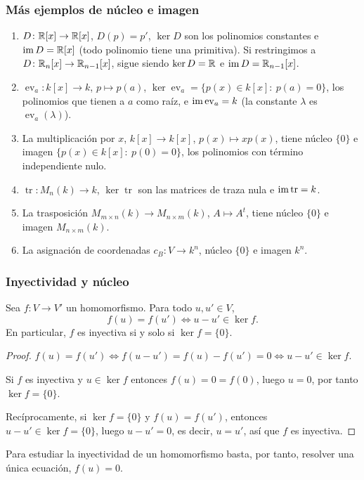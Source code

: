 \begin{frame}
    \frametitle{Más ejemplos de núcleo e imagen}

    \begin{example}
        \begin{enumerate}
            \item $D\colon\mathbb{R}[x]\to\mathbb{R}[x]$, $D(p)=p'$, $\ker D$ son los
            polinomios constantes e $\operatorname{im} D=\mathbb{R}[x]$ (todo polinomio tiene
            una primitiva). Si restringimos a $D\colon\mathbb{R}_n[x]\to\mathbb{R}_{n-1}[x]$,
            sigue siendo $\ker D=\mathbb{R}$ e $\operatorname{im} D=\mathbb{R}_{n-1}[x]$.
            \item $\operatorname{ev}_a\colon k[x]\to k$, $p\mapsto p(a)$,
            $\ker\operatorname{ev}_a=\{p(x)\in k[x]:\ p(a)=0\}$, los polinomios que tienen a $a$ como raíz, e
            $\operatorname{im}\operatorname{ev}_a=k$ (la constante $\lambda$ es
            $\operatorname{ev}_a(\lambda)$).
            \item La multiplicación por $x$, $k[x]\to k[x]$, $p(x)\mapsto xp(x)$, tiene núcleo $\{0\}$
            e imagen $\{p(x)\in k[x]:\ p(0)=0\}$, los polinomios con término independiente nulo.
            \item $\operatorname{tr}\colon M_n(k)\to k$,
            $\ker\operatorname{tr}$ son las matrices de traza nula e
            $\operatorname{im}\operatorname{tr}=k$.
            \item La trasposición $M_{m\times n}(k)\to M_{n\times m}(k)$, $A\mapsto A^t$, tiene núcleo $\{0\}$ e
            imagen $M_{n\times m}(k)$.
            \item La asignación de coordenadas $c_B\colon V\to k^n$, núcleo $\{0\}$ e imagen $k^n$.
        \end{enumerate}
    \end{example}
\end{frame}


\begin{frame}
    \frametitle{Inyectividad y núcleo}

    \begin{proposition}
        Sea $f\colon V\to V'$ un homomorfismo. Para todo $u,u'\in V$,
        \[
            f(u)=f(u')\iff u-u'\in\ker f.
        \]
        En particular, $f$ es inyectiva si y solo si $\ker f=\{0\}$.
    \end{proposition}

    \begin{proof}
        $f(u)=f(u')\iff f(u-u')=f(u)-f(u')=0\iff u-u'\in\ker f$.

        Si $f$ es inyectiva y $u\in \ker f$ entonces $f(u)=0=f(0)$, luego $u=0$, por tanto $\ker f=\{0\}$.
        
        Recíprocamente,
        si $\ker f=\{0\}$ y $f(u)=f(u')$, entonces $u-u'\in\ker f=\{0\}$,
        luego $u-u'=0$, es decir, $u=u'$, así que $f$ es inyectiva.
    \end{proof}

    \medskip

    Para estudiar la inyectividad de un homomorfismo basta, por tanto,
    resolver una \alert{única} ecuación, $f(u)=0$.
\end{frame}


